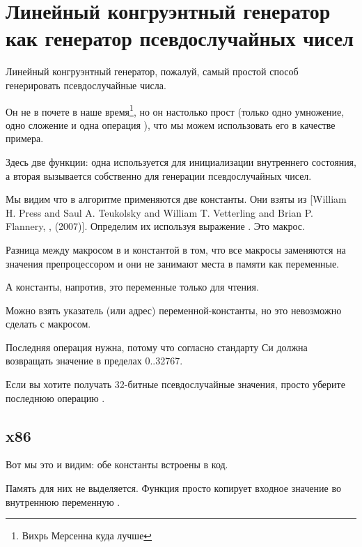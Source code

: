 \section[Линейный конгруэнтный генератор]{Линейный конгруэнтный генератор как генератор псевдослучайных чисел}
\label{LCG_simple}

Линейный конгруэнтный генератор, пожалуй, самый простой способ генерировать псевдослучайные числа.

Он не в почете в наше время\footnote{Вихрь Мерсенна куда лучше}, но он настолько прост
(только одно умножение, одно сложение и одна операция ),
что мы можем использовать его в качестве примера.



Здесь две функции: одна используется для инициализации внутреннего состояния, а вторая
вызывается собственно для генерации псевдослучайных чисел.

Мы видим что в алгоритме применяются две константы.
Они взяты из
[William H. Press and Saul A. Teukolsky and William T. Vetterling and Brian P. Flannery, , (2007)].
Определим их используя выражение \CCpp {}. Это макрос.

Разница между макросом в \CCpp и константой в том, что все макросы заменяются на значения препроцессором
\CCpp и они не занимают места в памяти как переменные.

А константы, напротив, это переменные только для чтения.

Можно взять указатель (или адрес) переменной-константы, но это невозможно сделать с макросом.

Последняя операция  нужна, потому что согласно стандарту Си  должна возвращать значение в пределах
0..32767.

Если вы хотите получать 32-битные псевдослучайные значения, просто уберите последнюю операцию .

\subsection{x86}



Вот мы это и видим: обе константы встроены в код.

Память для них не выделяется.
Функция  просто копирует входное значение во внутреннюю переменную .

